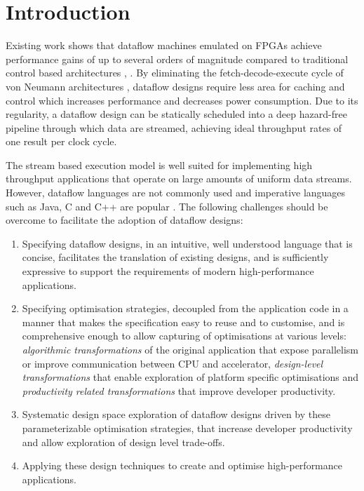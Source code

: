 \section{Introduction}

Existing work shows that dataflow machines emulated on FPGAs achieve
performance gains of up to several orders of magnitude compared to
traditional control based architectures \cite{Flynn:Pell:Mencer:2012},
\cite{Mencer:2012}.  By eliminating the fetch-decode-execute cycle of
von Neumann architectures \cite{Neumann:1993}, dataflow designs
require less area for caching and control which increases performance
and decreases power consumption. Due to its regularity, a dataflow
design can be statically scheduled into a deep hazard-free pipeline
through which data are streamed, achieving ideal throughput rates of
one result per clock cycle.

The stream based execution model is well suited for implementing high
throughput applications that operate on large amounts of uniform data
streams. However, dataflow languages are not commonly used and
imperative languages such as Java, C and C++ are popular
\cite{Tiobe:2012}. The following challenges should be overcome to
facilitate the adoption of dataflow designs:
\begin{enumerate}
\item Specifying dataflow designs, in an intuitive, well understood
  language that is concise, facilitates the translation of existing
  designs, and is sufficiently expressive to support the requirements
  of modern high-performance applications.
\item Specifying optimisation strategies, decoupled from the
  application code in a manner that makes the specification easy to
  reuse and to customise, and is comprehensive enough to allow
  capturing of optimisations at various levels: \emph{algorithmic
    transformations} of the original application that expose
  parallelism or improve communication between CPU and accelerator,
  \emph{design-level transformations} that enable exploration of
  platform specific optimisations and \emph{productivity related
    transformations} that improve developer productivity.
\item Systematic design space exploration of dataflow designs driven
  by these parameterizable optimisation strategies, that increase
  developer productivity and allow exploration of design level
  trade-offs.
\item Applying these design techniques to create and optimise
  high-performance applications.
\end{enumerate}


